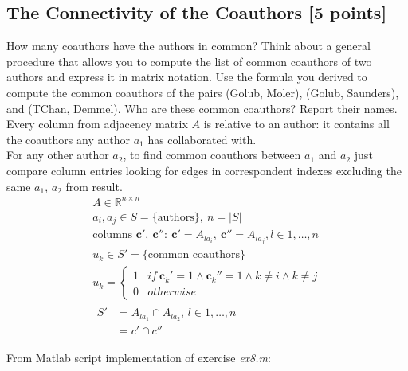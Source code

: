 \documentclass[unicode,11pt,a4paper,oneside,numbers=endperiod,openany]{scrartcl}
\newcommand{\myv}{\mathbf}
\begin{document}
\cleardoublepage

\subsection{The Connectivity of the Coauthors [5 points]}

How many coauthors have the authors in common?
Think about a general procedure that allows you to compute the list of common coauthors of two authors
and express it in matrix notation.
Use the formula you derived to compute the common coauthors of the pairs
(Golub, Moler), (Golub, Saunders), and (TChan, Demmel).
Who are these common coauthors? Report their names. \\

Every column from adjacency matrix $A$ is relative to an author:
it contains all the coauthors any author $a_1$ has collaborated with. \\
For any other author $a_2$, to find common coauthors between $a_1$ and $a_2$ just compare column entries looking for edges in correspondent indexes
excluding the same $a_1$, $a_2$ from result. \\

\begin{gather*} \label{ex8_common_coauthors}
    A \in \mathbb{R}^{n \times n} \nonumber\\
    a_i, a_j \in S = \{\text{authors}\},\ n = |S| \nonumber\\
    \text{columns } \myv{c}',\ \myv{c}'':\ \myv{c}' = A_{l a_i},\ \myv{c}'' = A_{l a_j}, l \in {1, \dots, n} \nonumber\\
    u_k \in S' = \{\text{common coauthors}\} \nonumber\\
    u_k = \begin{cases}
        1 & if\ \myv{c}_k' = 1 \land \myv{c}_k'' = 1 \land k \neq i \land k \neq j \nonumber \\
        0 & otherwise
    \end{cases} \nonumber\\
    \begin{split}
        S'  &= A_{l a_1} \cap A_{l a_2},\, l \in {1, \dots, n} \nonumber\\
        &= c' \cap c''
    \end{split}
\end{gather*}

From Matlab script implementation of exercise \textit{ex8.m}:
\end{document}
